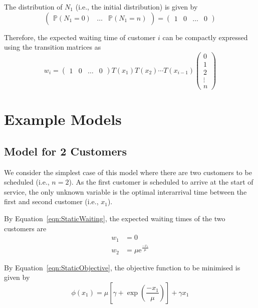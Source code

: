 The distribution of $N_{1}$ (i.e., the initial distribution) is given by
\begin{equation}
	\left( \begin{array}{ccc} \mathbb{P} (N_{1} = 0) & \ldots & \mathbb{P} (N_{1} = n) \end{array} \right) = \left( \begin{array}{cccc} 1 & 0 & \ldots & 0 \end{array} \right)
\end{equation}

Therefore, the expected waiting time of customer $i$ can be compactly expressed using the transition matrices as
\begin{equation}
	w_{i}
	= \left( \begin{array}{cccc} 1 & 0 & \ldots & 0 \end{array} \right)
	T (x_{1}) T (x_{2}) \cdots T (x_{i - 1})
	\left( \begin{array}{c} 0 \\ 1 \\ 2 \\ \vdots \\ n \end{array} \right)
	\label{eqn:StaticWaiting}
\end{equation}

\section{Example Models}
\subsection{Model for 2 Customers}
\label{sec:StaticTwoCust}
We consider the simplest case of this model where there are two customers to be scheduled (i.e., $n = 2$). As the first customer is scheduled to arrive at the start of service, the only unknown variable is the optimal interarrival time between the first and second customer (i.e., $x_{1}$).

By Equation~\ref{eqn:StaticWaiting}, the expected waiting times of the two customers are
\begin{equation}
	\begin{split}
		w_{1} & = 0 \\
		w_{2} & = \mu \mathrm{e}^{\frac{- x_{1}}{\mu}}
	\end{split}
\end{equation}

By Equation~\ref{eqn:StaticObjective}, the objective function to be minimised is given by
\begin{equation}
	\phi (x_{1}) = \mu \left[ \gamma + \exp \left( \frac{- x_{1}}{\mu} \right) \right] + \gamma x_{1}
\end{equation}

